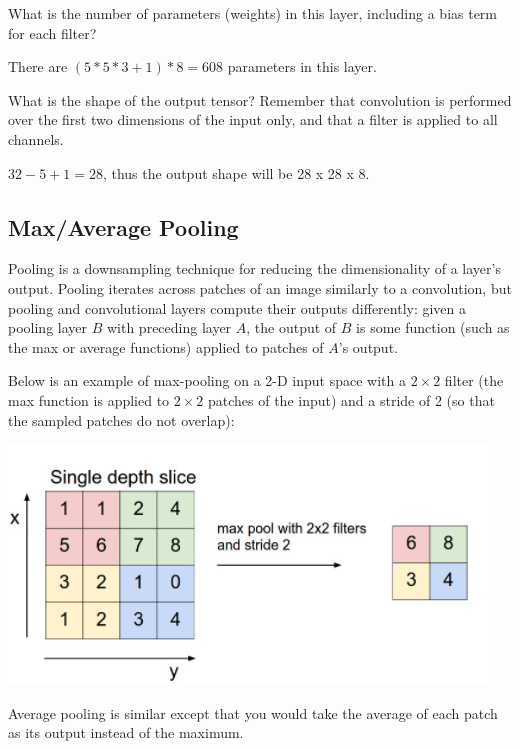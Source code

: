 \problem[2] What is the number of parameters (weights) in this layer, including a bias term for each filter?

\begin{subsolution}
  There are $(5 * 5 * 3 + 1) * 8 = 608$ parameters in this layer. 
\end{subsolution}

\problem[3] What is the shape of the output tensor? Remember that convolution is performed over the first two dimensions of the input only, and that a filter is applied to all channels.

\begin{subsolution}
  $32-5 + 1 = 28$, thus the output shape will be 28 x 28 x 8.
\end{subsolution}

 \subsection{Max/Average Pooling}

Pooling is a downsampling technique for reducing the dimensionality of a layer's output. Pooling iterates across patches of an image similarly to a convolution, but pooling and convolutional layers compute their outputs differently: given a pooling layer $B$ with preceding layer $A$, the output of $B$ is some function (such as the max or average functions) applied to patches of $A$'s output.

Below is an example of max-pooling on a 2-D input space with a $2\times 2$ filter (the max function is applied to $2\times 2$ patches of the input) and a stride of 2 (so that the sampled patches do not overlap):

\begin{center}
  \includegraphics[width=.49\textwidth]{Plots/MaxPool.png}
\end{center}

Average pooling is similar except that you would take the average of each patch as its output instead of the maximum.

